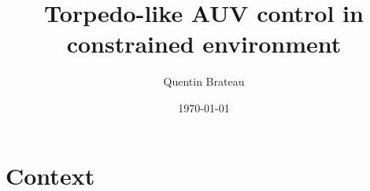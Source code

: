 \documentclass[10pt, xcolor={usenames, dvipsnames}]{beamer}
\title{Torpedo-like AUV control in constrained environment}
\date{\today}
\author{Quentin Brateau}
\institute{ENSTA Bretagne}
\begin{document}
    \maketitle


    \section{Context}



\end{document}
